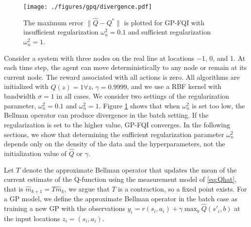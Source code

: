 \documentclass[letterpaper,12pt,peerreviewca,draftcls]{IEEEtran}
\begin{document}
\begin{comment}
\begin{wrapfigure}[14]{r}{0.3\textwidth}
\vspace{-10pt}
	\fbox{
        \texttt{[image: ./figures/divergence.pdf]} }
        \vspace{-10pt}
\caption{The maximum error $\|\hat Q - Q^*\|$ is plotted for GP-FQI with insufficient regularization $\omega_n^2 = 0.1$ and sufficient regularization $\omega_n^2 = 1$.}
	\label{fig:div}
\end{wrapfigure}
\end{comment}

\begin{figure}[H]
\centering
        \texttt{[image: ./figures/gpq/divergence.pdf]} 
\caption{The maximum error $\|\hat Q - Q^*\|$ is plotted for GP-FQI with insufficient regularization $\omega_n^2 = 0.1$ and sufficient regularization $\omega_n^2 = 1$.}
	\label{fig:div}
\end{figure}


Consider a system with three nodes on the real line at locations $-1$, $0$, and $1$. At each time step, the agent can move deterministically to any node or remain at its current node. The reward associated with all actions is zero. All algorithms are initialized with $\hat Q(z) = 1 \forall z$, $\gamma = 0.9999$, and we use a RBF kernel with bandwidth $\sigma = 1$ in all cases. We consider two settings of the regularization parameter, $\omega_n^2 = 0.1$ and $\omega_n^2 = 1$.  Figure \ref{fig:div} shows that when $\omega_n^2$ is set too low, the Bellman operator can produce divergence in the batch setting. If the regularization is set to the higher value, GP-FQI converges.  In the following sections, we show that determining the sufficient regularization parameter $\omega_n^2$ depends only on the density of the data and the hyperparameters, not the initialization value of $\hat Q$ or $\gamma$. %

Let $T$ denote the approximate Bellman operator that updates the mean of the current estimate of the Q-function
using the measurement model of \eqref{eq:Qhat}, that is $\hat m_{k+1}=T\hat m_{k}$, we argue that $T$ is a contraction, so a fixed point exists. %
For a GP model, we define the approximate Bellman operator in the batch case as training a new GP with the observations $y_i = r(s_i,a_i) + \gamma \max_b \hat Q(s'_i, b)$ at the input locations $z_i = (s_i,  a_i)$.
\end{document}
